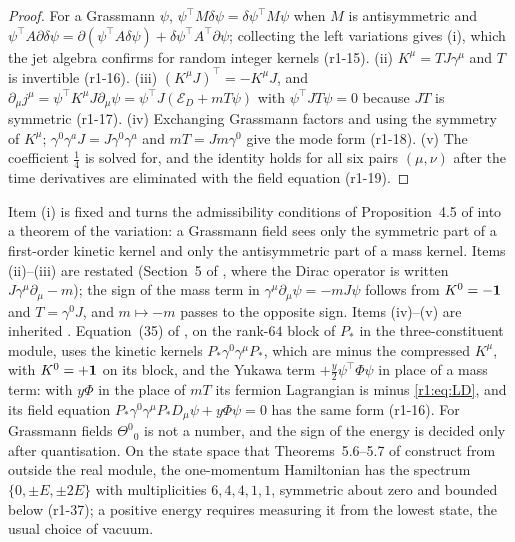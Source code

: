 \begin{proof}
For a Grassmann $\psi$, $\psi^{\!\top}M\delta\psi=\delta\psi^{\!\top}M\psi$ when $M$ is antisymmetric and $\psi^{\!\top}A\partial\delta\psi=
\partial(\psi^{\!\top}A\delta\psi)+\delta\psi^{\!\top}A^{\!\top}\partial\psi$; collecting the left variations gives (i), which the jet algebra
confirms for random integer kernels (r1-15). (ii) $K^\mu=TJ\gamma^\mu$ and $T$ is invertible (r1-16). (iii) $(K^\mu J)^{\!\top}=-K^\mu J$,
and $\partial_\mu j^\mu=\psi^{\!\top}K^\mu J\partial_\mu\psi=\psi^{\!\top}J(\mathcal E_D+mT\psi)$ with $\psi^{\!\top}JT\psi=0$ because $JT$ is
symmetric (r1-17). (iv) Exchanging Grassmann factors and using the symmetry of $K^\mu$;
$\gamma^0\gamma^aJ=J\gamma^0\gamma^a$ and $mT=Jm\gamma^0$ give the mode form (r1-18). (v) The coefficient $\tfrac14$ is solved
for, and the identity holds for all six pairs $(\mu,\nu)$ after the time derivatives are eliminated with the field equation (r1-19).
\end{proof}

Item (i) is fixed and turns the admissibility conditions of Proposition~4.5 of \cite{ES17} into a theorem of the variation: a Grassmann field
sees only the symmetric part of a first-order kinetic kernel and only the antisymmetric part of a mass kernel. Items (ii)--(iii) are
restated (Section~5 of \cite{ES17}, where the Dirac operator is written $J\gamma^\mu\partial_\mu-m$); the sign of the mass term in
$\gamma^\mu\partial_\mu\psi=-mJ\psi$ follows from $K^0=-\mathbf 1$ and $T=\gamma^0J$, and $m\mapsto-m$ passes to the opposite sign. Items
(iv)--(v) are inherited \cite{Belinfante40,WeinbergQFT}. Equation~(35) of \cite{ES17}, on the rank-$64$ block of $P_*$ in the
three-constituent module, uses the kinetic kernels $P_*\gamma^0\gamma^\mu P_*$, which are minus the compressed $K^\mu$, with $K^0=+\mathbf 1$ on its
block, and the Yukawa term $+\tfrac y2\psi^{\!\top}\Phi\psi$ in place of a mass term: with $y\Phi$ in the place of $mT$ its fermion Lagrangian is
minus \eqref{r1:eq:LD}, and its field equation $P_*\gamma^0\gamma^\mu P_*D_\mu\psi+y\Phi\psi=0$ has the same form (r1-16). For Grassmann
fields $\Theta^0{}_0$ is not a number, and the sign of the energy is decided only after quantisation. On the state space that
Theorems~5.6--5.7 of \cite{ES17} construct from outside the real module, the one-momentum Hamiltonian has the spectrum
$\{0,\pm E,\pm2E\}$ with multiplicities $6,4,4,1,1$, symmetric about zero and bounded below (r1-37); a positive energy requires measuring
it from the lowest state, the usual choice of vacuum.

